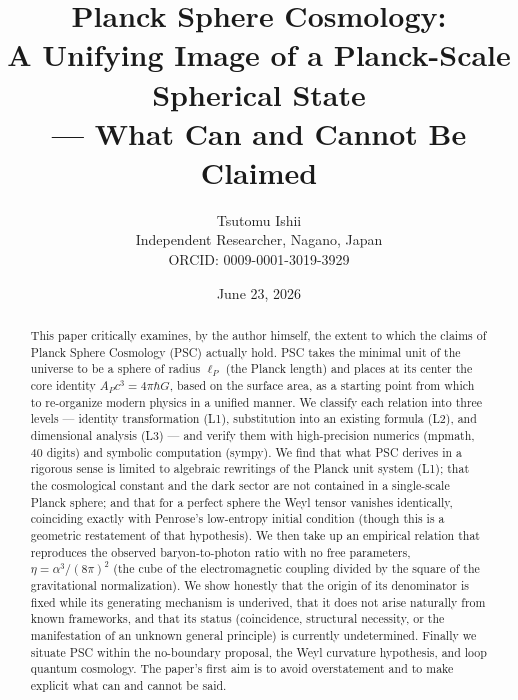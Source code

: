 \documentclass[11pt,a4paper]{article}
\title{\bfseries Planck Sphere Cosmology:\\ A Unifying Image of a Planck-Scale Spherical State\\ --- What Can and Cannot Be Claimed}
\author{Tsutomu Ishii\\ Independent Researcher, Nagano, Japan\\ ORCID: 0009-0001-3019-3929}
\date{June 23, 2026}
\newcommand{\eP}{\ell_P}
\begin{document}
\maketitle

\begin{abstract}
This paper critically examines, by the author himself, the extent to which the claims of Planck Sphere Cosmology (PSC) actually hold. PSC takes the minimal unit of the universe to be a sphere of radius $\eP$ (the Planck length) and places at its center the core identity $A_P c^3 = 4\pi\hbar G$, based on the surface area, as a starting point from which to re-organize modern physics in a unified manner. We classify each relation into three levels --- identity transformation (L1), substitution into an existing formula (L2), and dimensional analysis (L3) --- and verify them with high-precision numerics (mpmath, 40 digits) and symbolic computation (sympy). We find that what PSC derives in a rigorous sense is limited to algebraic rewritings of the Planck unit system (L1); that the cosmological constant and the dark sector are not contained in a single-scale Planck sphere; and that for a perfect sphere the Weyl tensor vanishes identically, coinciding exactly with Penrose's low-entropy initial condition (though this is a geometric restatement of that hypothesis). We then take up an empirical relation that reproduces the observed baryon-to-photon ratio with no free parameters, $\eta = \alpha^3/(8\pi)^2$ (the cube of the electromagnetic coupling divided by the square of the gravitational normalization). We show honestly that the origin of its denominator is fixed while its generating mechanism is underived, that it does not arise naturally from known frameworks, and that its status (coincidence, structural necessity, or the manifestation of an unknown general principle) is currently undetermined. Finally we situate PSC within the no-boundary proposal, the Weyl curvature hypothesis, and loop quantum cosmology. The paper's first aim is to avoid overstatement and to make explicit what can and cannot be said.
\end{abstract}
\end{document}
